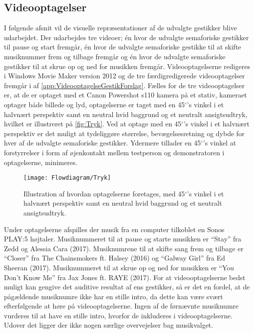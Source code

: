 \subsection{Videooptagelser}
\label{VideooptagelserValgAfGestikker}
%
I følgende afsnit vil de visuelle repræsentationer af de udvalgte gestikker blive udarbejdet. Der udarbejdes tre videoer; én hvor de udvalgte semaforiske gestikker til pause og start fremgår, én hvor de udvalgte semaforiske gestikke til at skifte musiknummer frem og tilbage fremgår og én hvor de udvalgte semaforiske gestikker til at skrue op og ned for musikken fremgår. Videooptagelserne redigeres i Windows Movie Maker version 2012 og de tre færdigredigerede videooptagelser fremgår i af \autoref{app:VideooptagelseGestikForslag}.\blankline
%
Fælles for de tre videooptagelser er, at de er optaget med et Canon Powershot s110 kamera på et stativ, kameraet optager både billede og lyd, optagelserne er taget med en 45$^{\circ}$'s vinkel i et halvnært perspektiv samt en neutral hvid baggrund og et neutralt ansigtsudtryk, hvilket er illustreret på \autoref{fig:Tryk}. Ved at optage med en 45$^{\circ}$'s vinkel i et halvnært perspektiv er det muligt at tydeliggøre størrelse, bevægelsesretning og dybde for hver af de udvalgte semaforiske gestikker. Ydermere tillader en 45$^{\circ}$'s vinkel at forstyrrelser i form af øjenkontakt mellem testperson og demonstratoren i optagelserne, minimeres. 
%
\begin{figure}[H]
	\centering
	\texttt{[image: Flowdiagram/Tryk]}
	\caption{Illustration af hvordan optagelserne foretages, med 45$^{\circ}$'s vinkel i et halvnært perspektiv samt en neutral hvid baggrund og et neutralt ansigtsudtryk.}
	\label{fig:Tryk}
\end{figure}
\noindent
%
Under optagelserne afspilles der musik fra en computer tilkoblet en Sonos PLAY:5 højtaler. Musiknummeret til at pause og starte musikken er \enquote{Stay} fra Zedd og Alessia Cara (2017). Musiknumrene til at skifte sang frem og tilbage er \enquote{Closer} fra The Chainsmokers ft. Halsey (2016) og \enquote{Galway Girl} fra Ed Sheeran (2017). Musiknummeret til at skrue op og ned for musikken er \enquote{You Don't Know Me} fra Jax Jones ft. RAYE (2017). For at videooptagelserne bedst muligt kan gengive det auditive resultat af ens gestikker, så er det en fordel, at de pågældende musiknumre ikke har en stille intro, da dette kan være svært efterfølgende at høre på videooptagelserne. Ingen af de førnævnte musiknumre vurderes til at have en stille intro, hvorfor de inkluderes i videooptagelserne. Udover det ligger der ikke nogen særlige overvejelser bag musikvalget. 

